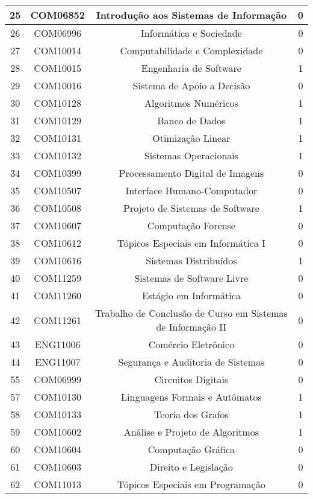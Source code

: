 \begin{apendices}
{\begin{longtable}{|c|c|c|c|}
25 & COM06852 & Introdução aos Sistemas de Informação & 0 \\ \hline
26 & COM06996 & Informática e Sociedade & 0 \\ \hline
27 & COM10014 & Computabilidade e Complexidade & 0 \\ \hline
28 & COM10015 & Engenharia de Software & 1 \\ \hline
29 & COM10016 & Sistema de Apoio a Decisão & 0 \\ \hline
30 & COM10128 & Algoritmos Numéricos & 1 \\ \hline
31 & COM10129 & Banco de Dados & 1 \\ \hline
32 & COM10131 & Otimização Linear & 1 \\ \hline
33 & COM10132 & Sistemas Operacionais & 1 \\ \hline
34 & COM10399 & Processamento Digital de Imagens & 0 \\ \hline
35 & COM10507 & Interface Humano-Computador & 0 \\ \hline
36 & COM10508 & Projeto de Sistemas de Software & 1 \\ \hline
37 & COM10607 & Computação Forense & 0 \\ \hline
38 & COM10612 & Tópicos Especiais em Informática I & 0 \\ \hline
39 & COM10616 & Sistemas Distribuídos & 1 \\ \hline
40 & COM11259 & Sistemas de Software Livre & 0 \\ \hline
41 & COM11260 & Estágio em Informática & 0 \\ \hline
42 & COM11261 & Trabalho de Conclusão de Curso em Sistemas de Informação II & 0 \\ \hline
43 & ENG11006 & Comércio Eletrônico & 0 \\ \hline
44 & ENG11007 & Segurança e Auditoria de Sistemas & 0 \\ \hline
55 & COM06999 & Circuitos Digitais & 0 \\ \hline
57 & COM10130 & Linguagens Formais e Autômatos & 1 \\ \hline
58 & COM10133 & Teoria dos Grafos & 1 \\ \hline
59 & COM10602 & Análise e Projeto de Algoritmos & 1 \\ \hline
60 & COM10604 & Computação Gráfica & 0 \\ \hline
61 & COM10603 & Direito e Legislação & 0 \\ \hline
62 & COM11013 & Tópicos Especiais em Programação & 0 \\ \hline

\end{longtable}}
\end{apendices}
